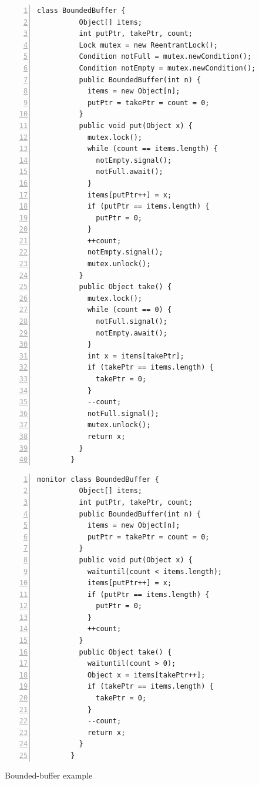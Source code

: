 \documentclass[preprint]{sigplanconf}
\begin{document}
\begin{figure}[ht!]
\begin{multicols}{2}
    \begin{Verbatim}[fontsize=\footnotesize,gobble=8,frame=topline,
            framesep=5mm,numbers=left,numbersep=2pt,
            label=\fbox{\small\emph{Explicit-Signal}}]
        class BoundedBuffer {
          Object[] items;  
          int putPtr, takePtr, count;
          Lock mutex = new ReentrantLock();
          Condition notFull = mutex.newCondition();
          Condition notEmpty = mutex.newCondition();
          public BoundedBuffer(int n) {
            items = new Object[n];
            putPtr = takePtr = count = 0;
          }
          public void put(Object x) {
            mutex.lock();
            while (count == items.length) {
              notEmpty.signal();
              notFull.await();
            }
            items[putPtr++] = x;
            if (putPtr == items.length) {
              putPtr = 0;
            }
            ++count;
            notEmpty.signal();
            mutex.unlock();
          }
          public Object take() {
            mutex.lock();
            while (count == 0) {
              notFull.signal();
              notEmpty.await();
            }
            int x = items[takePtr];
            if (takePtr == items.length) {
              takePtr = 0;
            }
            --count;
            notFull.signal();
            mutex.unlock();
            return x;
          }
        }
    \end{Verbatim}
    \begin{Verbatim}[fontsize=\footnotesize,gobble=8,frame=lines,framesep=5mm,
            numbers=left,numbersep=2pt,
            label=\fbox{\small\emph{Implicit-Signal}}]
        monitor class BoundedBuffer { 
          Object[] items; 
          int putPtr, takePtr, count; 
          public BoundedBuffer(int n) {
            items = new Object[n];
            putPtr = takePtr = count = 0;
          }
          public void put(Object x) { 
            waituntil(count < items.length); 
            items[putPtr++] = x; 
            if (putPtr == items.length) { 
              putPtr = 0; 
            } 
            ++count; 
          } 
          public Object take() { 
            waituntil(count > 0); 
            Object x = items[takePtr++]; 
            if (takePtr == items.length) { 
              takePtr = 0; 
            }
            --count;
            return x;
          }
        }
    \end{Verbatim}
\end{multicols}
  \caption{Bounded-buffer example}
  \label{fig:bb_exp}
\end{figure}
\end{document}
